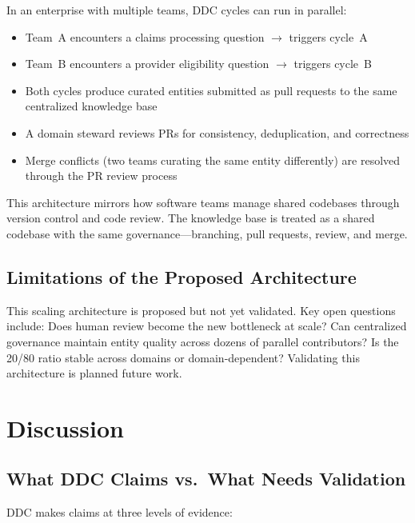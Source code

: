\documentclass[11pt,a4paper]{article}
\begin{document}
In an enterprise with multiple teams, DDC cycles can run in parallel:

\begin{itemize}[nosep]
  \item Team~A encounters a claims processing question $\rightarrow$ triggers cycle~A
  \item Team~B encounters a provider eligibility question $\rightarrow$ triggers cycle~B
  \item Both cycles produce curated entities submitted as pull requests to the same centralized knowledge base
  \item A domain steward reviews PRs for consistency, deduplication, and correctness
  \item Merge conflicts (two teams curating the same entity differently) are resolved through the PR review process
\end{itemize}

This architecture mirrors how software teams manage shared codebases through version control and code review. The knowledge base is treated as a shared codebase with the same governance---branching, pull requests, review, and merge.

\subsection{Limitations of the Proposed Architecture}

This scaling architecture is proposed but not yet validated. Key open questions include: Does human review become the new bottleneck at scale? Can centralized governance maintain entity quality across dozens of parallel contributors? Is the 20/80 ratio stable across domains or domain-dependent? Validating this architecture is planned future work.

\section{Discussion}
\label{sec:discussion}

\subsection{What DDC Claims vs.\ What Needs Validation}

DDC makes claims at three levels of evidence:
\end{document}
